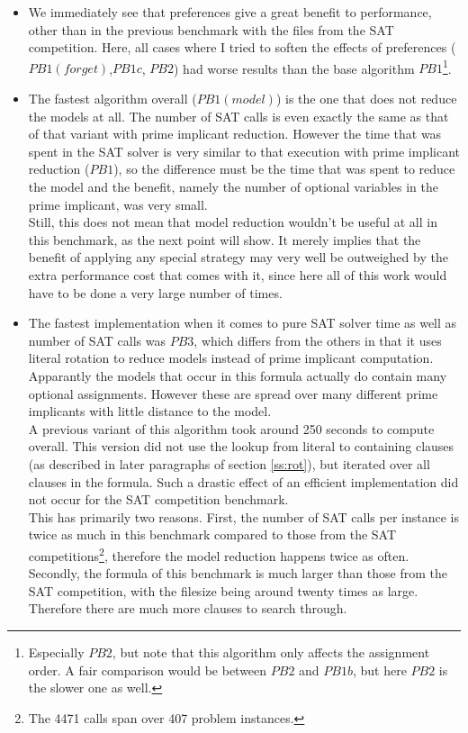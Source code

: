 \begin{itemize}
\item We immediately see that preferences give a great benefit to performance, other than in the previous benchmark with the files from the SAT competition. Here, all cases where I tried to soften the effects of preferences ($PB1(forget)$,$PB1c$, $PB2$) had worse results than the base algorithm $PB1$\footnote{
	Especially $PB2$, but note that this algorithm only affects the assignment order. A fair comparison would be between $PB2$ and $PB1b$, but here $PB2$ is the slower one as well.
}. 
\item The fastest algorithm overall ($PB1(model)$) is the one that does not reduce the models at all. The number of SAT calls is even exactly the same as that of that variant with prime implicant reduction. However the time that was spent in the SAT solver is very similar to that execution with prime implicant reduction ($PB1$), so the difference must be the time that was spent to reduce the model and the benefit, namely the number of optional variables in the prime implicant, was very small.\\
Still, this does not mean that model reduction wouldn't be useful at all in this benchmark, as the next point will show. It merely implies that the benefit of applying any special strategy may very well be outweighed by the extra performance cost that comes with it, since here all of this work would have to be done a very large number of times.
\item The fastest implementation when it comes to pure SAT solver time as well as number of SAT calls was $PB3$, which differs from the others in that it uses literal rotation to reduce models instead of prime implicant computation. Apparantly the models that occur in this formula actually do contain many optional assignments. However these are spread over many different prime implicants with little distance to the model.\\
A previous variant of this algorithm took around 250 seconds to compute overall. This version did not use the lookup from literal to containing clauses (as described in later paragraphs of section \ref{ss:rot}), but iterated over all clauses in the formula. Such a drastic effect of an efficient implementation did not occur for the SAT competition benchmark.\\
This has primarily two reasons. First, the number of SAT calls per instance is twice as much in this benchmark compared to those from the SAT competitions\footnote{The 4471 calls span over 407 problem instances.}, therefore the model reduction happens twice as often. Secondly, the formula of this benchmark is much larger than those from the SAT competition, with the filesize being around twenty times as large. Therefore there are much more clauses to search through.

\end{itemize}
